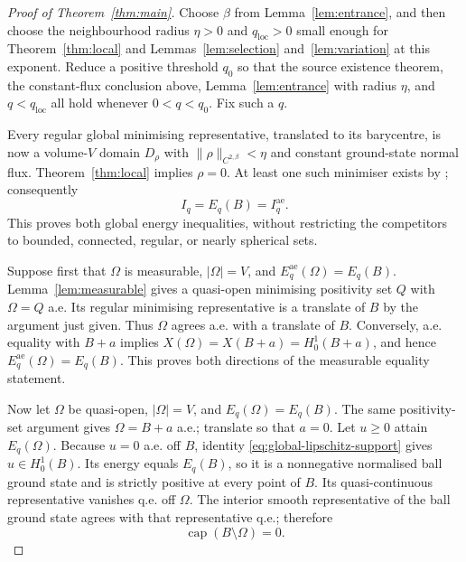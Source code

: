 \documentclass[11pt,a4paper]{article}
\theoremstyle{definition}
\theoremstyle{remark}
\begin{document}
\begin{proof}[Proof of Theorem~\ref{thm:main}]
Choose $\beta$ from Lemma~\ref{lem:entrance}, and then choose the
neighbourhood radius $\eta>0$ and $q_{\mathrm{loc}}>0$ small enough
for Theorem~\ref{thm:local} and Lemmas~\ref{lem:selection}
and~\ref{lem:variation} at this exponent.  Reduce a positive threshold
$q_0$ so that the source existence theorem, the constant-flux
conclusion above, Lemma~\ref{lem:entrance} with radius $\eta$, and
$q<q_{\mathrm{loc}}$ all hold whenever $0<q<q_0$.
Fix such a $q$.

Every regular global minimising representative, translated to its
barycentre, is now a volume-$V$ domain $D_\rho$ with
$\|\rho\|_{C^{2,\beta}}<\eta$ and constant ground-state normal
flux.  Theorem~\ref{thm:local} implies $\rho=0$.
At least one such minimiser exists by
\cite[Theorem~1.2]{MMR2025}; consequently
\[
 I_q=E_q(B)=I_q^{\mathrm{ae}}.
\]
This proves both global energy inequalities, without restricting the
competitors to bounded, connected, regular, or nearly spherical
sets.

Suppose first that $\Omega$ is measurable, $|\Omega|=V$, and
$E_q^{\mathrm{ae}}(\Omega)=E_q(B)$.
Lemma~\ref{lem:measurable} gives a quasi-open minimising positivity
set $Q$ with $\Omega=Q$ a.e.  Its regular minimising representative is
a translate of $B$ by the argument just given.  Thus $\Omega$ agrees
a.e. with a translate of $B$.
Conversely, a.e. equality with $B+a$ implies
$X(\Omega)=X(B+a)=H^1_0(B+a)$, and hence
$E_q^{\mathrm{ae}}(\Omega)=E_q(B)$.  This proves both directions of
the measurable equality statement.

Now let $\Omega$ be quasi-open, $|\Omega|=V$, and
$E_q(\Omega)=E_q(B)$.  The same positivity-set argument gives
$\Omega=B+a$ a.e.; translate so that $a=0$.
Let $u\geq0$ attain $E_q(\Omega)$.
Because $u=0$ a.e. off $B$, identity
\eqref{eq:global-lipschitz-support} gives $u\in H^1_0(B)$.
Its energy equals $E_q(B)$, so it is a nonnegative normalised ball
ground state and is strictly positive at every point of $B$.
Its quasi-continuous representative vanishes q.e. off $\Omega$.
The interior smooth representative of the ball ground state agrees
with that representative q.e.; therefore
\begin{equation}
 \operatorname{cap}(B\setminus\Omega)=0.
 \label{eq:global-no-slits}
\end{equation}


\end{proof}
\end{document}
